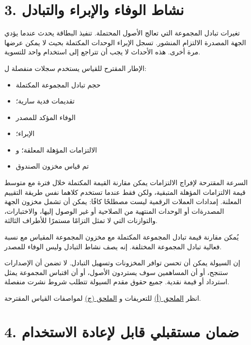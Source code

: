 \documentclass[11pt]{article}
\begin{document}
\section*{3. نشاط الوفاء والإبراء والتبادل}

تغيرات تبادل المجموعة التي تعالج الأصول المحتملة. تنفيذ البطاقة يحدث عندما يؤدي الجهة المصدرة الالتزام المنشور. تسجل الإبراء الوحدات المكتملة بحيث لا يمكن عرضها مرة أخرى. هذه الأحداث لا يجب أن تتراجع إلى استخدام واحد للتسوية.

الإطار المقترح للقياس يستخدم سجلات منفصلة ل:

\begin{itemize}[leftmargin=*]
\item حجم تبادل المجموعة المكتملة
\item تقديمات فدية سارية؛
\item الوفاء المؤكد للمصدر
\item الإبراء؛
\item الالتزامات المؤهلة المعلقة؛ و
\item تم قياس مخزون الصندوق
\end{itemize}
السرعة المقترحة لإفراج الالتزامات يمكن مقارنة القيمة المكتملة خلال فترة مع متوسط قيمة الالتزامات المؤهلة المتبقية، ولكن فقط عندما تستخدم كلاهما نفس طريقة التقييم المعلنة. إمدادات العملات الرقمية ليست مصطلحًا كافًا: يمكن أن تشمل مخزون الجهة المصدرةات أو الوحدات المنتهية من الصلاحية أو غير الوصول إليها، والاختبارات، والتوازنات التي لا تمثل التزامًا مستمرًا للأطراف الثالثة.

يُمكن مقارنة قيمة تبادل المجموعة المكتملة مع مخزون المجموعة المقياس مع نسبة فعالية تبادل المجموعة المختلفة. إنه يصف نشاط التبادل وليس الوفاء للمصدر.

إن السيولة يمكن أن تحسن توافر المخزونات وتسهيل التبادل. لا تضمن أن الإصدارات ستنجح، أو أن المساهمين سوف يستردون الأصول، أو أن اقتباس المجموعة يمثل استرداد أو قيمة نقدية. جميع حقوق مقدم السيولة تتطلب شروط نشرت منفصلة.

انظر \href{https://docs.cosmolocal.credit/ar/white-paper/appendix-a-math-box}{الملحق (أ)} للتعريفات و \href{https://docs.cosmolocal.credit/ar/white-paper/appendix-c-kpi-definitions}{الملحق (ج)} لمواصفات القياس المقترحة.


\section*{4. ضمان مستقبلي قابل لإعادة الاستخدام}
\end{document}
